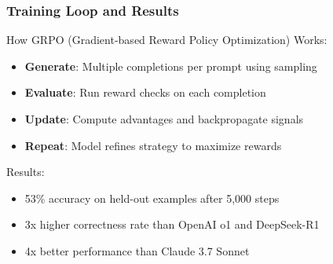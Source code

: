 \documentclass[aspectratio=169]{beamer}
\begin{document}
\begin{frame}
	\frametitle{Training Loop and Results}
	\begin{block}{How GRPO (Gradient-based Reward Policy Optimization) Works:}
		\begin{itemize}
			\item \textbf{Generate}: Multiple completions per prompt using sampling
			\item \textbf{Evaluate}: Run reward checks on each completion
			\item \textbf{Update}: Compute advantages and backpropagate signals
			\item \textbf{Repeat}: Model refines strategy to maximize rewards
		\end{itemize}
	\end{block}
	\begin{block}{Results:}
		\begin{itemize}
			\item 53\% accuracy on held-out examples after 5,000 steps
			\item 3x higher correctness rate than OpenAI o1 and DeepSeek-R1
			\item 4x better performance than Claude 3.7 Sonnet
		\end{itemize}
	\end{block}
\end{frame}
\end{document}
